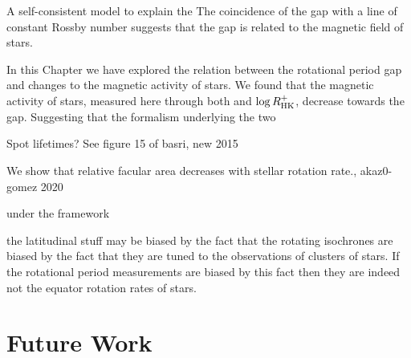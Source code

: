 A self-consistent model to explain the
The coincidence of the gap with a line of constant Rossby number suggests that the gap is related to the magnetic field of stars.







In this Chapter we have explored the relation between the rotational period gap and changes to the magnetic activity of stars.
We found that the magnetic activity of stars, measured here through both \rper{} and  $\log R^{+}_{\rm{HK}}$, decrease towards the gap.
Suggesting that the formalism underlying the two


Spot lifetimes? See figure 15 of basri, new 2015


We show that relative facular area decreases
with stellar rotation rate., akaz0-gomez 2020

under the framework



the latitudinal stuff
may be biased by the fact that the rotating isochrones are biased by the fact that they are tuned to the observations of clusters of stars. If the rotational period measurements are biased by this fact then they are indeed not the equator rotation rates of stars.




\section{Future Work}


